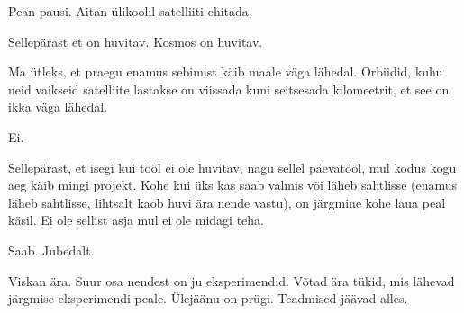 
Pean pausi. Aitan ülikoolil satelliiti ehitada. 


Sellepärast et on huvitav. Kosmos on huvitav.


Ma ütleks, et praegu enamus sebimist käib maale väga lähedal. Orbiidid, kuhu neid vaikseid satelliite lastakse on viissada kuni seitsesada kilomeetrit, et see on ikka väga lähedal.


Ei.


Sellepärast, et isegi kui tööl ei ole  huvitav, nagu sellel päevatööl, mul kodus kogu aeg käib mingi projekt. Kohe kui üks kas saab  valmis või läheb sahtlisse (enamus läheb sahtlisse, lihtsalt kaob huvi ära nende vastu),  on järgmine kohe laua peal käsil. Ei ole sellist asja mul ei ole  midagi teha.


Saab. Jubedalt. 


Viskan ära. Suur osa nendest on ju eksperimendid. Võtad ära tükid, mis lähevad  järgmise eksperimendi peale. Ülejäänu on prügi. Teadmised jäävad alles.
